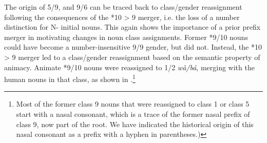 \documentclass[output=paper,,modfonts,nonflat]{langsci/langscibook}
\begin{document}
The origin of 5/9, and 9/6 can be traced back to class/gender reassignment following the consequences of the *10 > 9 merger, i.e. the loss of a number distinction for N- initial nouns. This again shows the importance of a prior prefix merger in motivating changes in noun class assignments. Former *9/10 nouns could have become a number-insensitive 9/9 gender, but did not. Instead, the *10 > 9 merger led to a class/gender reassignment based on the semantic property of animacy. Animate *9/10 nouns were reassigned to 1/2 \textit{wà/bá}, merging with the human nouns in that class, as shown in .\footnote{Most of the former class 9 nouns that were reassigned to class 1 or class 5 start with a nasal consonant, which is a trace of the former nasal prefix of class 9, now part of the root. We have indicated the historical origin of this nasal consonant as a prefix with a hyphen in parentheses.)}


\end{document}
